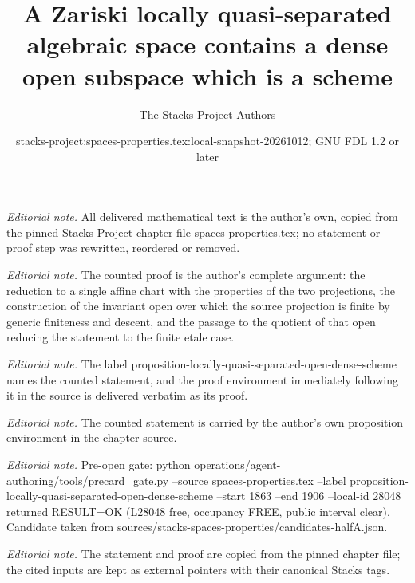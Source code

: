 \documentclass[10pt,a4paper]{amsart}
\title{A Zariski locally quasi-separated algebraic space contains a dense open subspace which is a scheme}
\author{The Stacks Project Authors}
\date{stacks-project:spaces-properties.tex:local-snapshot-20261012; GNU FDL 1.2 or later}
\theoremstyle{plain}
\theoremstyle{definition}
\theoremstyle{remark}
\numberwithin{equation}{subsection}
\begin{document}
\maketitle
\noindent\textit{Editorial note.} All delivered mathematical text is the author's own, copied from the pinned Stacks Project chapter file spaces-properties.tex; no statement or proof step was rewritten, reordered or removed.\par\medskip
\noindent\textit{Editorial note.} The counted proof is the author's complete argument: the reduction to a single affine chart with the properties of the two projections, the construction of the invariant open over which the source projection is finite by generic finiteness and descent, and the passage to the quotient of that open reducing the statement to the finite etale case.\par\medskip
\noindent\textit{Editorial note.} The label proposition-locally-quasi-separated-open-dense-scheme names the counted statement, and the proof environment immediately following it in the source is delivered verbatim as its proof.\par\medskip
\noindent\textit{Editorial note.} The counted statement is carried by the author's own proposition environment in the chapter source.\par\medskip
\noindent\textit{Editorial note.} Pre-open gate: python operations/agent-authoring/tools/precard\_gate.py --source spaces-properties.tex --label proposition-locally-quasi-separated-open-dense-scheme --start 1863 --end 1906 --local-id 28048 returned RESULT=OK (L28048 free, occupancy FREE, public interval clear). Candidate taken from sources/stacks-spaces-properties/candidates-halfA.json.\par\medskip
\noindent\textit{Editorial note.} The statement and proof are copied from the pinned chapter file; the cited inputs are kept as external pointers with their canonical Stacks tags.\par\medskip
\end{document}
